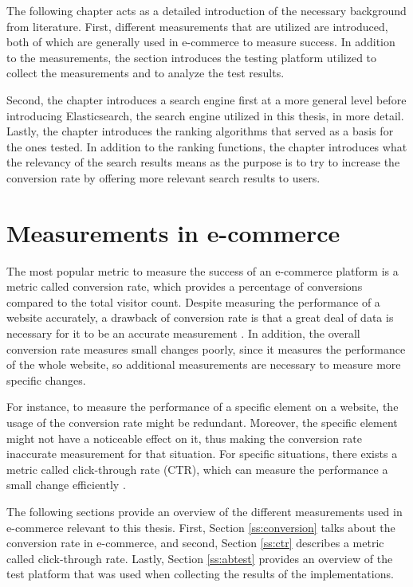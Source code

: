 

The following chapter acts as a detailed introduction of the necessary background from literature.
First, different measurements that are utilized are introduced, 
both of which are generally used in e-commerce to measure success.
In addition to the measurements, the section introduces the testing platform utilized to collect the measurements
and to analyze the test results.

Second, the chapter introduces a search engine first at a more general level before introducing
Elasticsearch, the search engine utilized in this thesis, in more detail.
Lastly, the chapter introduces the ranking algorithms that served as a basis for the ones tested.
In addition to the ranking functions, the chapter introduces what the relevancy of the search results means
as the purpose is to try to increase the conversion rate by offering more relevant search results to users.



\section{Measurements in e-commerce}
\label{sec:measurements}

The most popular metric to measure the success of an e-commerce platform 
is a metric called conversion rate,
which provides a percentage of conversions compared to the total visitor count.
Despite measuring the performance of a website accurately, 
a drawback of conversion rate is that a great deal of data is necessary for it to be an accurate measurement 
\cite{conversionRateWhat}.
In addition, the overall conversion rate measures small changes poorly, 
since it measures the performance of the whole website, so
additional measurements are necessary to measure more specific changes.


For instance, to measure the performance of a specific element on a website, 
the usage of the conversion rate might be redundant. 
Moreover, the specific element might not have a noticeable effect on it, 
thus making the conversion rate inaccurate measurement for that situation.
For specific situations, there exists a metric called click-through rate (CTR), 
which can measure the performance a small change efficiently \cite{ctrWhat}.


The following sections provide an overview of the different measurements used in e-commerce relevant to this thesis.
First, Section \ref{ss:conversion} talks about the conversion rate in e-commerce, and second, 
Section \ref{ss:ctr} describes a metric called click-through rate.
Lastly, Section \ref{ss:abtest} provides an overview of the test platform that was used
when collecting the results of the implementations.


